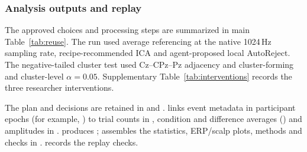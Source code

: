\subsubsection*{Analysis outputs and replay}

The approved choices and processing steps are summarized in main Table~\ref*{tab:reuse}. The run used average referencing at the native 1024\,Hz sampling rate, recipe-recommended ICA and agent-proposed local AutoReject. The negative-tailed cluster test used Cz--CPz--Pz adjacency and cluster-forming and cluster-level $\alpha=0.05$. Supplementary Table~\ref*{tab:interventions} records the three researcher interventions.

The plan and decisions are retained in  and .  links event metadata in participant epochs (for example, ) to trial counts in , condition and difference averages () and amplitudes in .  produces ;  assembles the statistics, ERP/scalp plots, methods and checks in .  records the replay checks.

